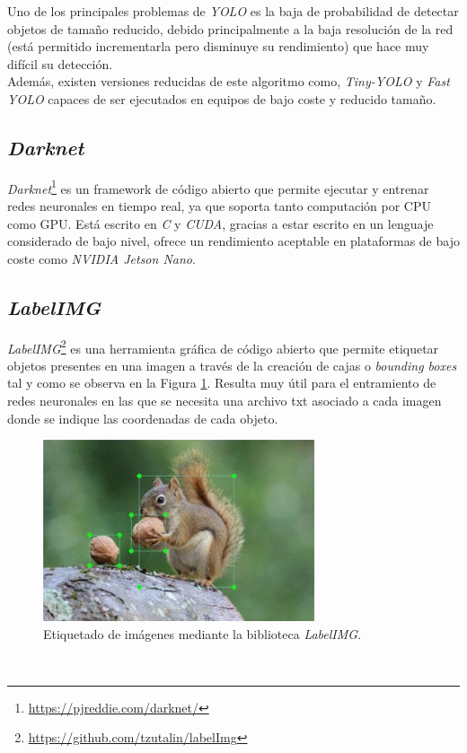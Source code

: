 Uno de los principales problemas de \textit{YOLO} es la baja de probabilidad de detectar objetos de tamaño reducido, debido principalmente a la baja resolución de la red (está permitido incrementarla pero disminuye su rendimiento) que hace muy difícil su detección.\\

Además, existen versiones reducidas de este algoritmo como, \textit{Tiny-YOLO} y \textit{Fast YOLO} capaces de ser ejecutados en equipos de bajo coste y reducido tamaño.\\

\subsection{\textit{Darknet}}
\label{subsection:darknet}
\textit{Darknet}\footnote{\url{https://pjreddie.com/darknet/}} es un framework de código abierto que permite ejecutar y entrenar redes neuronales en tiempo real, ya que soporta tanto computación por CPU como GPU. Está escrito en \textit{C} y \textit{CUDA}, gracias a estar escrito en un lenguaje considerado de bajo nivel, ofrece un rendimiento aceptable en plataformas de bajo coste como \textit{NVIDIA Jetson Nano}.\\

\subsection{\textit{LabelIMG}}
\textit{LabelIMG}\footnote{\url{https://github.com/tzutalin/labelImg}} es una herramienta gráfica de código abierto que permite etiquetar objetos presentes en una imagen a través de la creación de cajas o \textit{bounding boxes} tal y como se observa en la Figura \ref{fig:labelimg}. Resulta muy útil para el entramiento de redes neuronales en las que se necesita una archivo txt asociado a cada imagen donde se indique las coordenadas de cada objeto.

\begin{figure} [h!]
	\begin{center}
		\includegraphics[width=8cm]{figs/labelimg}
	\end{center}
	\caption{Etiquetado de imágenes mediante la biblioteca \textit{LabelIMG}.}
	\label{fig:labelimg}
\end{figure}\


